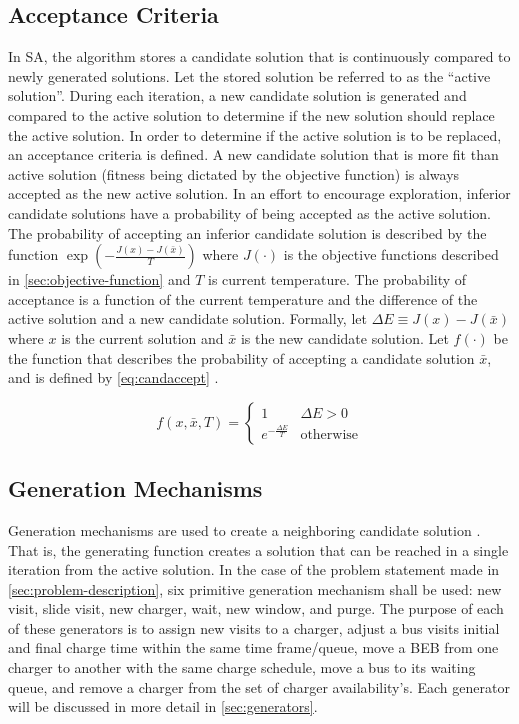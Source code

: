 \documentclass[11pt,a4paper,final]{article}
\newcommand{\Tau}{T}                        %
\begin{document}
\subsection{Acceptance Criteria}
\label{sec:acceptance}
In SA, the algorithm stores a candidate solution that is continuously compared to newly generated solutions. Let the
stored solution be referred to as the ``active solution''. During each iteration, a new candidate solution is generated
and compared to the active solution to determine if the new solution should replace the active solution. In order to
determine if the active solution is to be replaced, an acceptance criteria is defined. A new candidate solution that is
more fit than active solution (fitness being dictated by the objective function) is always accepted as the new active
solution. In an effort to encourage exploration, inferior candidate solutions have a probability of being accepted as
the active solution. The probability of accepting an inferior candidate solution is described by the function
\(\exp(-\frac{J(x) - J(\bar{x})}{\Tau})\) where \(J(\cdot)\) is the objective functions described in \ref{sec:objective-function} and
\(\Tau\) is current temperature. The probability of acceptance is a function of the current temperature and the difference
of the active solution and a new candidate solution. Formally, let \(\Delta E \equiv J(x) - J(\bar{x})\) where \(x\) is the current
solution and \(\bar{x}\) is the new candidate solution. Let \(f(\cdot)\) be the function that describes the probability of
accepting a candidate solution \(\bar{x}\), and is defined by \ref{eq:candaccept} \cite{keller-2019-multi-objec}.

\begin{equation}
\label{eq:candaccept}
f(x,\bar{x},T) =
\begin{cases}
  1                   & \Delta E > 0 \\
  e^{- \frac{\Delta E}{T}} & \text{otherwise}
\end{cases}
\end{equation}

\subsection{Generation Mechanisms}
\label{sec:generation-mechanisms}
Generation mechanisms are used to create a neighboring candidate solution \cite{gendreau-2018-handb-metah}. That is,
the generating function creates a solution that can be reached in a single iteration from the active solution. In the
case of the problem statement made in \ref{sec:problem-description}, six primitive generation mechanism shall be used: new
visit, slide visit, new charger, wait, new window, and purge. The purpose of each of these generators is to assign new
visits to a charger, adjust a bus visits initial and final charge time within the same time frame/queue, move a BEB from
one charger to another with the same charge schedule, move a bus to its waiting queue, and remove a charger from the set
of charger availability's. Each generator will be discussed in more detail in \ref{sec:generators}.
\end{document}
